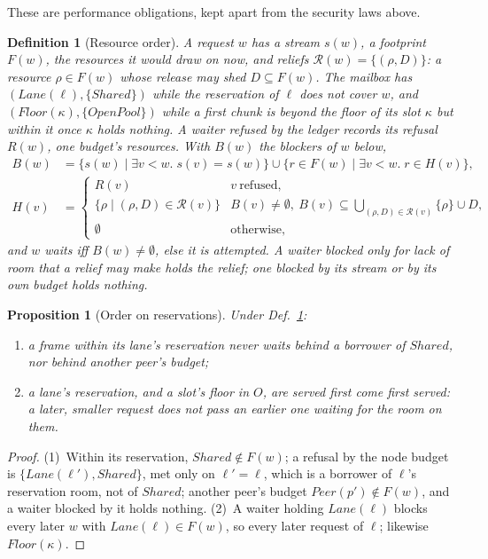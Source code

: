 \documentclass[journal]{IEEEtran}
\newtheorem{definition}{Definition}
\newtheorem{proposition}{Proposition}
\newcommand{\Rg}{\mathcal{R}}
\begin{document}
These are performance obligations, kept apart from the security laws above.

\begin{definition}[Resource order]\label{def:resorder}
A request $w$ has a stream $s(w)$, a footprint $F(w)$, the resources it would draw on now, and
reliefs $\Rg(w)=\{(\rho,D)\}$: a resource $\rho\in F(w)$ whose release may shed $D\subseteq
F(w)$.  The mailbox has $(\mathit{Lane}(\ell),\{\mathit{Shared}\})$ while the reservation of
$\ell$ does not cover $w$, and $(\mathit{Floor}(\kappa),\{\mathit{OpenPool}\})$ while a first
chunk is beyond the floor of its slot $\kappa$ but within it once $\kappa$ holds nothing.  A
waiter refused by the ledger records its refusal $R(w)$, one budget's resources.  With
$B(w)$ the blockers of $w$ below,
\[
\begin{aligned}
B(w)&=\{s(w)\mid\exists v<w.\;s(v)=s(w)\}\cup\{r\in F(w)\mid\exists v<w.\;r\in H(v)\},\\
H(v)&=\begin{cases}
R(v) & v\ \text{refused},\\
\{\rho\mid(\rho,D)\in\Rg(v)\} & B(v)\ne\emptyset,\
  B(v)\subseteq\textstyle\bigcup_{(\rho,D)\in\Rg(v)}\{\rho\}\cup D,\\
\emptyset & \text{otherwise},
\end{cases}
\end{aligned}
\]
and $w$ waits iff $B(w)\ne\emptyset$, else it is attempted.  A waiter blocked only for lack of
room that a relief may make \emph{holds} the relief; one blocked by its stream or by its own
budget holds nothing.
\end{definition}

\begin{proposition}[Order on reservations]\label{prop:resorder}
Under Def.~\ref{def:resorder}:
\begin{enumerate}[leftmargin=1.5em]
\item a frame within its lane's reservation never waits behind a borrower of $\mathit{Shared}$,
nor behind another peer's budget;
\item a lane's reservation, and a slot's floor in $O$, are served first come first served: a
later, smaller request does not pass an earlier one waiting for the room on them.
\end{enumerate}
\end{proposition}
\begin{proof}
(1)~Within its reservation, $\mathit{Shared}\notin F(w)$; a refusal by the node budget is
$\{\mathit{Lane}(\ell'),\mathit{Shared}\}$, met only on $\ell'=\ell$, which is a borrower of
$\ell$'s reservation room, not of $\mathit{Shared}$; another peer's budget
$\mathit{Peer}(p')\notin F(w)$, and a waiter blocked by it holds nothing.  (2)~A waiter
holding $\mathit{Lane}(\ell)$ blocks every later $w$ with $\mathit{Lane}(\ell)\in F(w)$, so
every later request of $\ell$; likewise $\mathit{Floor}(\kappa)$.
\end{proof}
\end{document}
